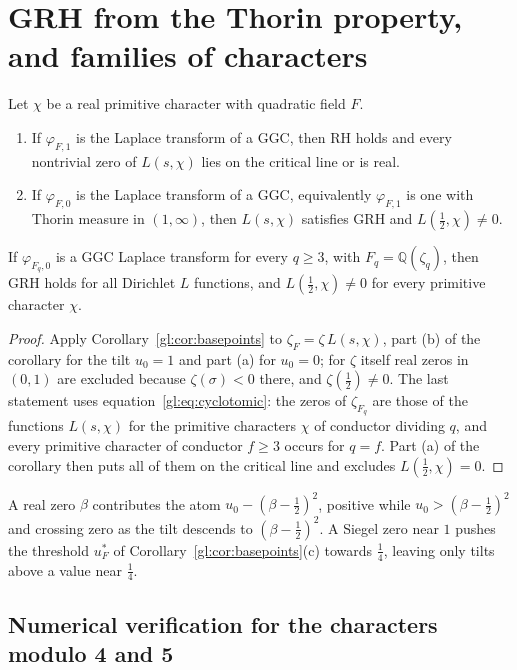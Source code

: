 \section{GRH from the Thorin property, and families of characters}\label{gl:sec:grh}

\begin{theorem}\label{gl:thm:grh}
Let $\chi$ be a real primitive character with quadratic field $F$.
\begin{enumerate}
\item[(a)] If $\varphi_{F,1}$ is the Laplace transform of a GGC, then RH holds and every nontrivial zero of $L(s,\chi)$ lies on the critical line or is real.
\item[(b)] If $\varphi_{F,0}$ is the Laplace transform of a GGC, equivalently $\varphi_{F,1}$ is one with Thorin measure in $(1,\infty)$, then $L(s,\chi)$ satisfies GRH and $L(\tfrac12,\chi)\neq0$.
\end{enumerate}
If $\varphi_{F_q,0}$ is a GGC Laplace transform for every $q\ge3$, with $F_q=\mathbb Q(\zeta_q)$, then GRH holds for all Dirichlet $L$ functions, and $L(\tfrac12,\chi)\neq0$ for every primitive character $\chi$.
\end{theorem}

\begin{proof}
Apply Corollary~\ref{gl:cor:basepoints} to $\zeta_F=\zeta\,L(s,\chi)$, part (b) of the corollary for the tilt $u_0=1$ and part (a) for $u_0=0$; for $\zeta$ itself real zeros in $(0,1)$ are excluded because $\zeta(\sigma)<0$ there, and $\zeta(\tfrac12)\neq0$. The last statement uses equation~\eqref{gl:eq:cyclotomic}: the zeros of $\zeta_{F_q}$ are those of the functions $L(s,\chi)$ for the primitive characters $\chi$ of conductor dividing $q$, and every primitive character of conductor $f\ge3$ occurs for $q=f$. Part (a) of the corollary then puts all of them on the critical line and excludes $L(\tfrac12,\chi)=0$.
\end{proof}

\begin{remark}
A real zero $\beta$ contributes the atom $u_0-(\beta-\tfrac12)^2$, positive while $u_0>(\beta-\tfrac12)^2$ and crossing zero as the tilt descends to $(\beta-\tfrac12)^2$. A Siegel zero near $1$ pushes the threshold $u_F^*$ of Corollary~\ref{gl:cor:basepoints}(c) towards $\tfrac14$, leaving only tilts above a value near $\tfrac14$.
\end{remark}

\subsection{Numerical verification for the characters modulo 4 and 5}\label{gl:sec:numchi}

